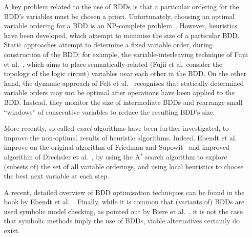 
A key problem related to the use of BDDs is that a particular ordering for the
BDD's variables must be chosen a priori. Unfortunately, choosing an optimal
variable ordering for a BDD is an NP-complete problem~\cite{Bollig1996}.
However, heuristics have been developed, which attempt to minimise the size of
a particular BDD. Static approaches attempt to determine a fixed variable
order, during construction of the BDD; for example, the variable-interleaving
technique of Fujii et al.~\cite{Fujii1993}, which aims to place
semantically-related (Fujii et al. consider the topology of the logic circuit)
variables near each other in the BDD. On the other hand, the dynamic approach
of Felt et al.~\cite{Felt1993} recognises that statically-determined variable
orders may not be optimal after operations have been applied to the BDD.
Instead, they monitor the size of intermediate BDDs and rearrange small
``windows'' of consecutive variables to reduce the resulting BDD's size.

More recently, so-called \emph{exact} algorithms have been further
investigated, to improve the non-optimal results of heuristic algorithms.
Indeed, {Ebendt et al.}~\cite{Ebendt2005} improve on the original algorithm of
{Friedman and Supowit}~\cite{Friedman1987} and improved algorithm of {Drechsler
et al.}~\cite{Drechsler1998}, by using the A$^\ast$ search algorithm to explore
(subsets of) the set of all variable orderings, and using local heuristics to
choose the best next variable at each step.

A recent, detailed overview of BDD optimisation techniques can be found in the
book by {Ebendt et al.}~\cite{Ebendt2005a}. Finally, while it is common that
(variants of) BDDs are used symbolic model checking, as pointed out by {Biere
et al.}~\cite{Biere1999}, it is not the case that symbolic methods imply the use
of BDDs, viable alternatives certainly do exist.
